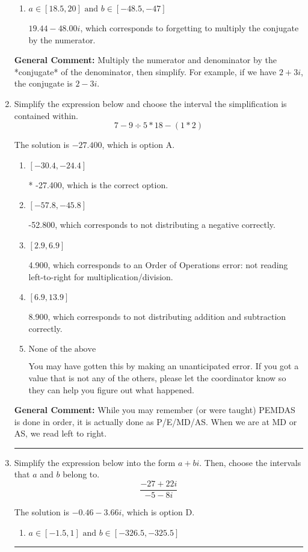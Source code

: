 \documentclass{extbook}[14pt]
\newcommand{\litem}[1]{\item #1

\rule{\textwidth}{0.4pt}}
\begin{document}
\begin{enumerate}
{\begin{enumerate}[label=\Alph*.]
* $19.44  - 1.92 i$, which is the correct option.
\item \( a \in [18.5, 20] \text{ and } b \in [-48.5, -47] \)

 $19.44  - 48.00 i$, which corresponds to forgetting to multiply the conjugate by the numerator.
\end{enumerate}

\textbf{General Comment:} Multiply the numerator and denominator by the *conjugate* of the denominator, then simplify. For example, if we have $2+3i$, the conjugate is $2-3i$.
}
\litem{
Simplify the expression below and choose the interval the simplification is contained within.
\[ 7 - 9 \div 5 * 18 - (1 * 2) \]

The solution is \( -27.400 \), which is option A.\begin{enumerate}[label=\Alph*.]
\item \( [-30.4, -24.4] \)

* -27.400, which is the correct option.
\item \( [-57.8, -45.8] \)

 -52.800, which corresponds to not distributing a negative correctly.
\item \( [2.9, 6.9] \)

 4.900, which corresponds to an Order of Operations error: not reading left-to-right for multiplication/division.
\item \( [6.9, 13.9] \)

 8.900, which corresponds to not distributing addition and subtraction correctly.
\item \( \text{None of the above} \)

 You may have gotten this by making an unanticipated error. If you got a value that is not any of the others, please let the coordinator know so they can help you figure out what happened.
\end{enumerate}

\textbf{General Comment:} While you may remember (or were taught) PEMDAS is done in order, it is actually done as P/E/MD/AS. When we are at MD or AS, we read left to right.
}
\litem{
Simplify the expression below into the form $a+bi$. Then, choose the intervals that $a$ and $b$ belong to.
\[ \frac{-27 + 22 i}{-5 - 8 i} \]

The solution is \( -0.46  - 3.66 i \), which is option D.\begin{enumerate}[label=\Alph*.]
\item \( a \in [-1.5, 1] \text{ and } b \in [-326.5, -325.5] \)


\end{enumerate}}
\end{enumerate}
\end{document}
